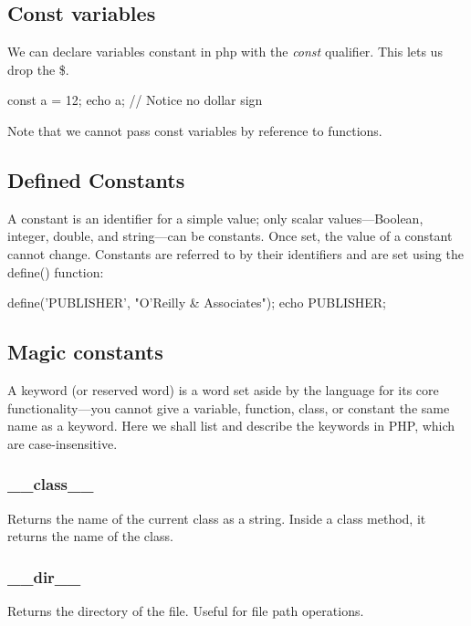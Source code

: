 \documentclass{report}
\begin{document}
    \bigbreak \noindent 
    \subsection{Const variables}
    \bigbreak \noindent 
    We can declare variables constant in php with the \textit{const} qualifier. This lets us drop the \$.
    \bigbreak \noindent 
    \begin{phpcode}
    const a = 12;
    echo a; // Notice no dollar sign
    \end{phpcode}
    \bigbreak \noindent 
    Note that we cannot pass const variables by reference to functions.
    

    \bigbreak \noindent 
    \subsection{Defined Constants}
    \bigbreak \noindent 
    A constant is an identifier for a simple value; only scalar values—Boolean, integer, double, and string—can be constants. Once set, the value of a constant cannot change. Constants are referred to by their identifiers and are set using the define() function:
    \bigbreak \noindent 
    \begin{phpcode}
    define('PUBLISHER', "O'Reilly & Associates");
    echo PUBLISHER;
    \end{phpcode}

    \pagebreak 
    \bigbreak \noindent 
    \subsection{Magic constants}
    \bigbreak \noindent 
    A keyword (or reserved word) is a word set aside by the language for its core functionality—you cannot give a variable, function, class, or constant the same name as a keyword. Here we shall list and describe the keywords in PHP, which are case-insensitive.
    \bigbreak \noindent 
    \subsubsection{\_\_class\_\_}
    \bigbreak \noindent 
    Returns the name of the current class as a string. Inside a class method, it returns the name of the class.
    \subsubsection{\_\_dir\_\_}
    \bigbreak \noindent 
    Returns the directory of the file. Useful for file path operations.
    \bigbreak \noindent 
\end{document}
